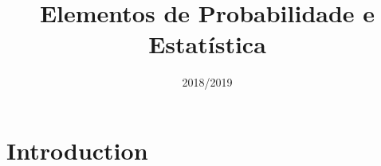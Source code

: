 \documentclass{report}
\title{Elementos de Probabilidade e Estatística}
\author{}
\date{2018/2019}
\begin{document}
\maketitle

\section{Introduction}
\end{document}
